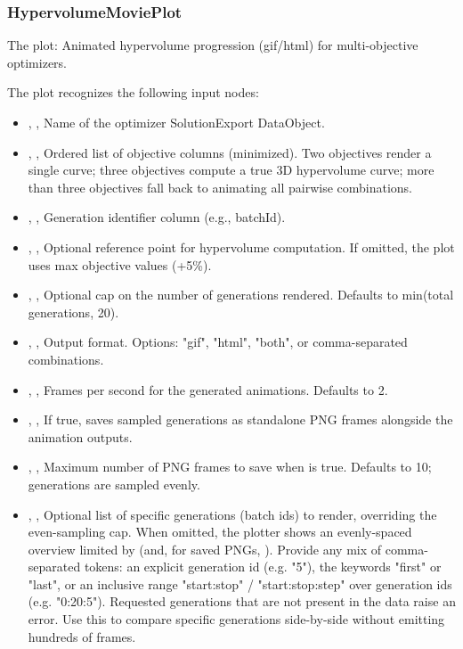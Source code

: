 \subsubsection{HypervolumeMoviePlot}
The   plot: Animated hypervolume progression (gif/html) for multi-objective optimizers.

The  plot recognizes the following input nodes:
\begin{itemize}
  \item {}, , Name of the optimizer SolutionExport DataObject.
  \item {}, , Ordered list of objective columns (minimized). Two objectives render a single curve; three objectives compute a true 3D hypervolume curve; more than three objectives fall back to animating all pairwise combinations.
  \item {}, , Generation identifier column (e.g., batchId).
  \item {}, , Optional reference point for hypervolume computation. If omitted, the plot uses max objective values (+5\%).
  \item {}, , Optional cap on the number of generations rendered. Defaults to min(total generations, 20).
  \item {}, , Output format. Options: "gif", "html", "both", or comma-separated combinations.
  \item {}, , Frames per second for the generated animations. Defaults to 2.
  \item {}, , If true, saves sampled generations as standalone PNG frames alongside the animation outputs.
  \item {}, , Maximum number of PNG frames to save when  is true. Defaults to 10; generations are sampled evenly.
  \item {}, , Optional list of specific generations (batch ids) to render, overriding the even-sampling cap. When omitted, the plotter shows an evenly-spaced overview limited by  (and, for saved PNGs, ). Provide any mix of comma-separated tokens: an explicit generation id (e.g. "5"), the keywords "first" or "last", or an inclusive range "start:stop" / "start:stop:step" over generation ids (e.g. "0:20:5"). Requested generations that are not present in the data raise an error. Use this to compare specific generations side-by-side without emitting hundreds of frames.
\end{itemize}

